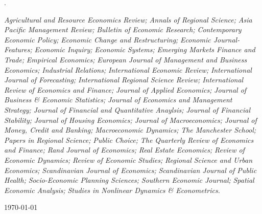 \documentclass{xetexCV}
\begin{document}
.


\nocite{*}



\begin{flushleft}
\emph{Agricultural and Resource Economics Review;}
\emph{Annals of Regional Science;}
\emph{Asia Pacific Management Review;}
\emph{Bulletin of Economic Research;}
\emph{Contemporary Economic Policy;} 
\emph{Economic Change and Restructuring;}
\emph{Economic Journal-Features;} 
\emph{Economic Inquiry;}
\emph{Economic Systems;}
\emph{Emerging Markets Finance and Trade;}
\emph{Empirical Economics;}
\emph{European Journal of Management and Business Economics;}
\emph{Industrial Relations;} 
\emph{International Economic Review;} 
\emph{International Journal of Forecasting;}
\emph{International Regional Science Review;}
\emph{International Review of Economics and Finance;}
\emph{Journal of Applied Economics;}
\emph{Journal of Business \& Economic Statistics;}
\emph{Journal of Economics and Management Strategy;} 
\emph{Journal of Financial and Quantitative Anaylsis;}
\emph{Journal of Financial Stability;}
\emph{Journal of Housing Economics;}
\emph{Journal of Macroeconomics;}
\emph{Journal of Money, Credit and Banking;} 
\emph{Macroeconomic Dynamics;}
\emph{The Manchester School;} 
\emph{Papers in Regional Science;} 
\emph{Public Choice;}
\emph{The Quarterly Review of Economics and Finance;}
\emph{Rand Journal of Economics;} 
\emph{Real Estate Economics;}
\emph{Review of Economic Dynamics;} 
\emph{Review of Economic Studies;} 
\emph{Regional Science and Urban Economics;} 
\emph{Scandinavian Journal of Economics;}
\emph{Scandinavian Journal of Public Health;}
\emph{Socio-Economic Planning Sciences;}
\emph{Southern Economic Journal;}
\emph{Spatial Economic Analysis;}
\emph{Studies in Nonlinear Dynamics \& Econometrics.}
\end{flushleft}
\begin{flushleft}
\today
\end{flushleft}
\end{document}
